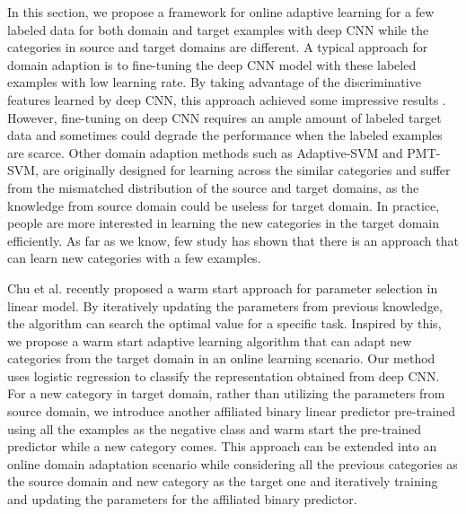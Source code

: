 ﻿In this section, we propose a framework for online adaptive learning for a few labeled data for both domain and target examples with deep CNN while the categories in source and target domains are different. A typical approach for domain adaption is to fine-tuning the deep CNN model with these labeled examples with low learning rate. By taking advantage of the discriminative features learned by deep CNN, this approach achieved some impressive results\cite{Chatfield14} \cite{zeiler2014visualizing}. However, fine-tuning on deep CNN requires an ample amount of labeled target data and sometimes could degrade the performance when the labeled examples are scarce\cite{hoffman2013one}. Other domain adaption methods such as Adaptive-SVM and PMT-SVM, are originally designed for learning across the similar categories and suffer from the mismatched distribution of the source and target domains, as the knowledge from source domain could be useless for target domain. In practice, people are more interested in learning the new categories in the target domain efficiently.
 As far as we know, few study has shown that there is an approach that can learn new categories with a few examples.

Chu et al. recently proposed a warm start approach for parameter selection in linear model. By iteratively updating the parameters from previous knowledge, the algorithm can search the optimal value for a specific task. Inspired by this, we propose a warm start adaptive learning algorithm that can adapt new categories from the target domain in an online learning scenario. Our method uses logistic regression to classify the representation obtained from deep CNN. For a new category in target domain, rather than utilizing the parameters from source domain, we introduce another affiliated binary linear predictor pre-trained using all the examples as the negative class and warm start the pre-trained predictor while a new category comes. This approach can be extended into an online domain adaptation scenario while considering all the previous categories as the source domain and new category as the target one and iteratively training and updating the parameters for the affiliated binary predictor. 